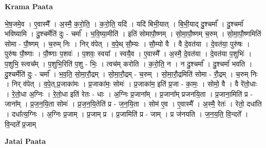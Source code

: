 \documentclass[17pt]{extarticle}
\begin{document}
\textbf{Krama Paata} \newline

भे॒ष॒जमे॒व । ए॒वास्मै᳚ । अ॒स्मै॒ क॒रो॒ति॒ । क॒रो॒ति॒ यदि॑ । यदि॑ बिभी॒यात् । बि॒भी॒याद् दु॒श्चर्मा᳚ । दु॒श्चर्मा॑ भविष्यामि । दु॒श्चर्मेति॑ दुः - चर्मा᳚ । भ॒वि॒ष्या॒मीति॑ । इति॑ सोमापौ॒ष्णम् । सो॒मा॒पौ॒ष्णम् च॒रुम् । सो॒मा॒पौ॒ष्णमिति॑ सोमा - पौ॒ष्णम् । च॒रुम् निः । निर् व॑पेत् । व॒पे॒थ् सौ॒म्यः । सौ॒म्यो वै । वै दे॒वत॑या । दे॒वत॑या॒ पुरु॑षः । पुरु॑षः पौ॒ष्णाः । पौ॒ष्णाः प॒शवः॑ । प॒शवः॒ स्वया᳚ । स्वयै॒व । ए॒वास्मै᳚ । अ॒स्मै॒ दे॒वत॑या । दे॒वत॑या प॒शुभिः॑ । प॒शुभि॒ स्त्वच᳚म् । प॒शुभि॒रिति॑ प॒शु - भिः॒ । त्वच॑म् करोति । क॒रो॒ति॒ न । न दु॒श्चर्मा᳚ । दु॒श्चर्मा॑ भवति । दु॒श्चर्मेति॑ दुः - चर्मा᳚ । भ॒व॒ति॒ सो॒मा॒रौ॒द्रम् । सो॒मा॒रौ॒द्रम् - च॒रुम् । सो॒मा॒रौ॒द्रमिति॑ सोमा - रौ॒द्रम् । च॒रुम् निः । निर् व॑पेत् । व॒पे॒त्,प्र॒जाका॑मः । प्र॒जाका॑मः॒ सोमः॑ । प्र॒जाका॑म॒ इति॑ प्र॒जा - का॒मः॒ । सोमो॒ वै । वै रे॑तो॒धाः । रे॒तो॒धा अ॒ग्निः । रे॒तो॒धा इति॑ रेतः - धाः । अ॒ग्निः प्र॒जाना᳚म् । प्र॒जाना᳚म् प्रजनयि॒ता । प्र॒जाना॒मिति॑ प्र - जाना᳚म् । प्र॒ज॒न॒यि॒ता सोमः॑ । प्र॒ज॒न॒यि॒तेति॑ प्र - ज॒न॒यि॒ता । सोम॑ ए॒व । ए॒वास्मै᳚ । अ॒स्मै॒ रेतः॑ । रेतो॒ दधा॑ति । दधा᳚त्य॒ग्निः । अ॒ग्निः प्र॒जाम् । प्र॒जाम् प्र । प्र॒जामिति॑ प्र - जाम् । प्र ज॑नयति । ज॒न॒य॒ति॒ वि॒न्दते᳚ । वि॒न्दते᳚ प्र॒जाम् \newline

\textbf{Jatai Paata} \newline
\end{document}
